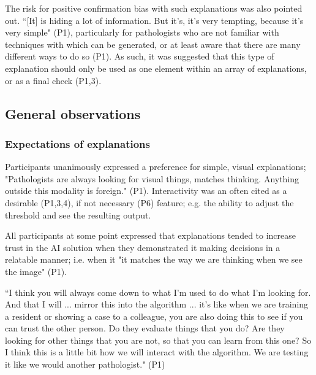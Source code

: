 The risk for positive confirmation bias with such explanations was also pointed out. ``[It] is hiding a lot of information. But it's, it's very tempting, because it's very simple" (P1), particularly for pathologists who are not familiar with techniques with which can be generated, or at least aware that there are many different ways to do so (P1). As such, it was suggested that this type of explanation should only be used as one element within an array of explanations, or as a final check (P1,3).

\subsection{General observations}

\subsubsection{Expectations of explanations}

Participants unanimously expressed a preference for simple, visual explanations; "Pathologists are always looking for visual things, matches thinking. Anything outside this modality is foreign." (P1).  Interactivity was an often cited as a desirable (P1,3,4), if not necessary (P6) feature; e.g. the ability to adjust the threshold and see the resulting output.

All participants at some point expressed that explanations tended to increase trust in the AI solution when they demonstrated it making decisions in a relatable manner; i.e. when it "it matches the way we are thinking when we see the image" (P1).

``I think you will always come down to what I'm used to do what I'm looking for. And that I will ... mirror this into the algorithm ... it's like when we are training a resident or showing a case to a colleague, you are also doing this to see if you can trust the other person. Do they evaluate things that you do? Are they looking for other things that you are not, so that you can learn from this one? So I think this is a little bit how we will interact with the algorithm. We are testing it like we would another pathologist." (P1)



